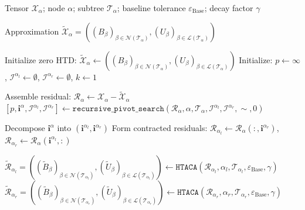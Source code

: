\documentclass{article}
\theoremstyle{plain}
\theoremstyle{definition}
\theoremstyle{remark}
\begin{document}
\begin{algorithm}[h!]
\caption{HTACA for tensors}
\label{alg:HTACA}
\begin{algorithmic}[1]

\Require Tensor $\mathcal{X}_\alpha$; node $\alpha$; subtree $\mathcal{T}_\alpha$;
baseline tolerance $\varepsilon_{\text{Base}}$; decay factor $\gamma$

\Ensure Approximation
$\widetilde{\mathcal{X}}_\alpha =
((B_\beta)_{\beta \in \mathcal{N}(\mathcal{T}_\alpha)},
 (U_\beta)_{\beta \in \mathcal{L}(\mathcal{T}_\alpha)})$

  \State Initialize zero HTD:
  $\widetilde{\mathcal{X}}_\alpha \gets ((B_\beta)_{\beta \in \mathcal{N}(\mathcal{T}_\alpha)},
  (U_\beta)_{\beta \in \mathcal{L}(\mathcal{T}_\alpha)})$
  \State Initialize: $p \gets \infty$,
  $\mathcal{I}^{\alpha_l}\gets\emptyset$,
  $\mathcal{I}^{\alpha_r}\gets\emptyset$, $k \gets 1$

   
    \State Assemble residual:
    $\mathcal{R}_\alpha \gets \mathcal{X}_\alpha - \widetilde{\mathcal{X}}_\alpha$
    \State $[p, \bm{i}^\alpha, \mathcal{I}^{\alpha_l}, \mathcal{I}^{\alpha_r}] \gets
      \texttt{recursive\_pivot\_search}\left(\mathcal{R}_\alpha, \alpha, \mathcal{T}_\alpha,
      \mathcal{I}^{\alpha_l}, \mathcal{I}^{\alpha_r}, \sim, 0\right)$

    \State Decompose $\bm{i}^\alpha$ into $(\bm{i}^{\alpha_l}, \bm{i}^{\alpha_r})$
    \State Form contracted residuals:
    $\mathcal{R}_{\alpha_l} \gets \mathcal{R}_\alpha(:, \bm{i}^{\alpha_r})$,
    $\mathcal{R}_{\alpha_r} \gets \mathcal{R}_\alpha(\bm{i}^{\alpha_l}, :)$

    \State
    $\widetilde{\mathcal{R}}_{\alpha_l} = ((\widetilde{B}_\beta)_{\beta\in\mathcal{N}(\mathcal{T}_{\alpha_l})},
       (\widetilde{U}_\beta)_{\beta\in\mathcal{L}(\mathcal{T}_{\alpha_l})})\gets
      \texttt{HTACA}\left(\mathcal{R}_{\alpha_l}, \alpha_l, \mathcal{T}_{\alpha_l},
      \varepsilon_{\text{Base}}, \gamma\right)$
    \State
    $\widetilde{\mathcal{R}}_{\alpha_r}=((\widetilde{B}_\beta)_{\beta\in\mathcal{N}(\mathcal{T}_{\alpha_r})},
       (\widetilde{U}_\beta)_{\beta\in\mathcal{L}(\mathcal{T}_{\alpha_r})}) \gets
      \texttt{HTACA}\left(\mathcal{R}_{\alpha_r}, \alpha_r, \mathcal{T}_{\alpha_r},
      \varepsilon_{\text{Base}}, \gamma\right)$


\end{algorithmic}
\end{algorithm}
\end{document}
